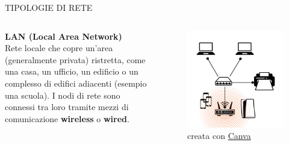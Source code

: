 \documentclass[aspectratio=1610]{beamer}
\begin{document}
\begin{frame}{TIPOLOGIE DI RETE}
    \begin{columns}
            \justifying
            \textbf{LAN (Local Area Network)} \\
            Rete locale che copre un'area (generalmente privata) ristretta, come una casa, un ufficio, un edificio 
            o un complesso di edifici adiacenti (esempio una scuola). I nodi di rete sono connessi tra loro tramite mezzi 
            di comunicazione \textbf{wireless} o \textbf{wired}.\\
            \begin{figure}
                \includegraphics[width=\linewidth]{img/lan.png}
                \caption{{creata con \href{https://www.canva.com/}{Canva}}}
            \end{figure}
    \end{columns}
\end{frame}
\end{document}

